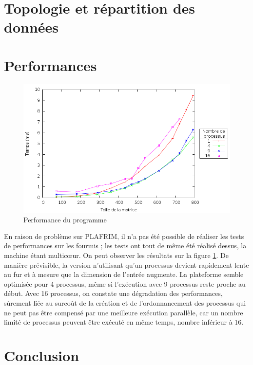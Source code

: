 \documentclass[a4paper,11pt]{article}
\begin{document}
\section{Topologie et répartition des données}


\section{Performances}

\begin{figure}[h!]
  \centering
  \includegraphics[width=\textwidth]{plot.png}
  \caption{Performance du programme}
  \label{perf}
\end{figure}

En raison de problème sur PLAFRIM, il n'a pas été possible de réaliser les tests de performances sur les fourmis ; les tests ont tout de même été réalisé dessus, la machine étant multicœur. On peut observer les résultats sur la figure \ref{perf}. De manière prévisible, la version n'utilisant qu'un processus devient rapidement lente au fur et à mesure que la dimension de l'entrée augmente. La plateforme semble optimisée pour 4 processus, même si l'exécution avec 9 processus reste proche au début. Avec 16 processus, on constate une dégradation des performances, sûrement liée au surcoût de la création et de l'ordonnancement des processus qui ne peut pas être compensé par une meilleure exécution parallèle, car un nombre limité de processus peuvent être exécuté en même temps, nombre inférieur à 16.
\section{Conclusion}
\end{document}
